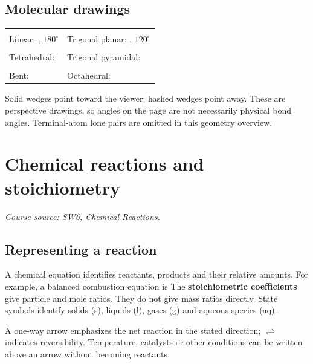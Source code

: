 \documentclass[a4paper,10pt]{article}
\newcommand{\source}[1]{{\small\textit{Course source: #1.}\par}}
\newcommand{\chapterbreak}{\clearpage}
\begin{document}
\subsection{Molecular drawings}
\begin{center}
\begin{tabular}{P{72mm}P{72mm}}
\centering{} &
\centering{}\tabularnewline[7mm]
\centering Linear: , $180^\circ$ &
\centering Trigonal planar: , $120^\circ$\tabularnewline[10mm]
\centering{} &
\centering{}\tabularnewline[7mm]
\centering Tetrahedral:  &
\centering Trigonal pyramidal: \tabularnewline[10mm]
\centering{} &
\centering{}\tabularnewline[7mm]
\centering Bent:  &
\centering Octahedral: \tabularnewline
\end{tabular}
\end{center}
Solid wedges point toward the viewer; hashed wedges point away. These are
perspective drawings, so angles on the page are not necessarily physical bond
angles. Terminal-atom lone pairs are omitted in this geometry overview.

\chapterbreak
\section{Chemical reactions and stoichiometry}
\label{sec:reactions}
\source{SW6, Chemical Reactions}

\subsection{Representing a reaction}
A chemical equation identifies reactants, products and their relative amounts.
For example, a balanced combustion equation is
The \textbf{stoichiometric coefficients} give particle and mole ratios. They do
not give mass ratios directly. State symbols identify solids (s), liquids (l),
gases (g) and aqueous species (aq).

A one-way arrow emphasizes the net reaction in the stated direction;
$\rightleftharpoons$ indicates reversibility. Temperature, catalysts or other
conditions can be written above an arrow without becoming reactants.
\end{document}
